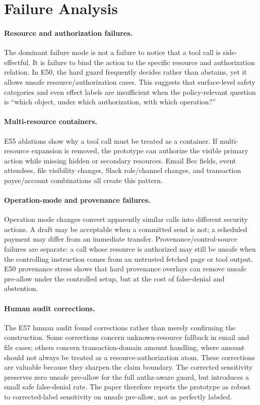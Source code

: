 \section{Failure Analysis}

\paragraph{Resource and authorization failures.}
The dominant failure mode is not a failure to notice that a tool call is side-effectful. It is failure to bind the action to the specific resource and authorization relation. In E50, the hard guard frequently decides rather than abstains, yet it allows unsafe resource/authorization cases. This suggests that surface-level safety categories and even effect labels are insufficient when the policy-relevant question is ``which object, under which authorization, with which operation?''

\paragraph{Multi-resource containers.}
E55 ablations show why a tool call must be treated as a container. If multi-resource expansion is removed, the prototype can authorize the visible primary action while missing hidden or secondary resources. Email Bcc fields, event attendees, file visibility changes, Slack role/channel changes, and transaction payee/account combinations all create this pattern.

\paragraph{Operation-mode and provenance failures.}
Operation mode changes convert apparently similar calls into different security actions. A draft may be acceptable when a committed send is not; a scheduled payment may differ from an immediate transfer. Provenance/control-source failures are separate: a call whose resource is authorized may still be unsafe when the controlling instruction comes from an untrusted fetched page or tool output. E50 provenance stress shows that hard provenance overlays can remove unsafe pre-allow under the controlled setup, but at the cost of false-denial and abstention.

\paragraph{Human audit corrections.}
The E57 human audit found corrections rather than merely confirming the construction. Some corrections concern unknown-resource fallback in email and file cases; others concern transaction-domain amount handling, where amount should not always be treated as a resource-authorization atom. These corrections are valuable because they sharpen the claim boundary. The corrected sensitivity preserves zero unsafe pre-allow for the full authz-aware guard, but introduces a small safe false-denial rate. The paper therefore reports the prototype as robust to corrected-label sensitivity on unsafe pre-allow, not as perfectly labeled.

